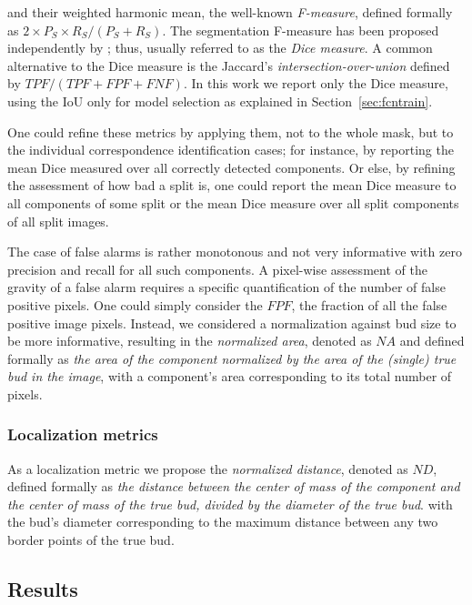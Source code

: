 \documentclass[a4paper,authoryear,review]{elsarticle}
\begin{document}
	and their weighted harmonic mean, the well-known \emph{F-measure}, defined formally as $2 \times P_S  \times R_S / (P_S + R_S)$. The segmentation F-measure has been proposed independently by \citet{dice1945measures}; thus, usually referred to as the \emph{Dice measure}. A common alternative to the Dice measure is the Jaccard’s \emph{intersection-over-union} \citep{jaccard1912distribution} defined by $TPF / (TPF+FPF+FNF)$.  In this work we report only the Dice measure, using the IoU only for model selection as explained in Section~\ref{sec:fcntrain}.
	
	One could refine these metrics by applying them, not to the whole mask, but to the individual correspondence identification cases; for instance, by reporting the mean Dice measured over all correctly detected components. Or else, by refining the assessment of how bad a split is, one could report the mean Dice measure to all components of some split or the mean Dice measure over all split components of all split images. 
	
	The case of false alarms is rather monotonous and not very informative with zero precision and recall for all such components. A pixel-wise assessment of the gravity of a false alarm requires a specific quantification of the number of false positive pixels. One could simply consider the $FPF$, the fraction of all the false positive image pixels. Instead, we considered a normalization against bud size to be more informative, resulting in the \emph{normalized area}, denoted as $NA$ and defined formally as \emph{the area of the component normalized by the area of the (single) true bud in the image}, with a component’s area  corresponding to its total number of pixels. 
	
	\subsubsection{Localization metrics}
	\label{subsec:locmetrics}
	
	As a localization metric we propose the \emph{normalized distance}, denoted as $ND$, defined formally as \emph{the distance between the center of mass of the component and the center of mass of the true bud, divided by the diameter of the true bud}. with the bud’s diameter corresponding to  the maximum distance between any two border points of the true bud.
	
	\subsection{Results}
	\label{sec:resultados}
	
\end{document}
